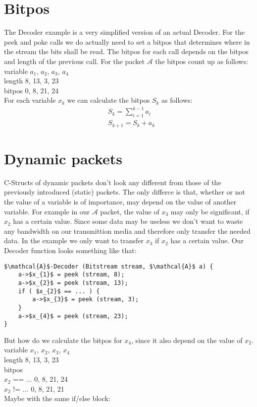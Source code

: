 \documentclass[paper=a4,DIV=12]{scrartcl}
\begin{document}
	\section{Bitpos}
		The Decoder example is a very simplified version of an actual Decoder. For the peek and poke calls we do actually need to set a bitpos
		that determines where in the stream the bits shall be read. The bitpos for each call depends on the bitpos and length of the previous call.
		For the packet $\mathcal{A}$ the bitpos count up as follows:\\
		variable   $a_{1}$, $a_{2}$, $a_{3}$, $a_{4}$\\
		length      8, 13,  3, 23\\
		bitpos      0,  8, 21, 24\\
		For each variable $x_{k}$ we can calculate the bitpos $S_{k}$ as follows:
		\begin{align*}
			&S_{k} = \sum_{i=1}^{k-1} a_{i}\\
			&S_{k+1} = S_{k} + a_{k}
		\end{align*}
	\section{Dynamic packets}
		C-Structs of dynamic packets don't look any different from those of the previously introduced (static) packets.
		The only differce is that, whether or not the value of a variable is of importance, may depend on the value of another variable.	
		For example in our $\mathcal{A}$ packet, the value of $x_{3}$ may only be significant, if $x_{2}$ has a certain value.
		Since some data may be useless we don't want to waste any bandwidth on our transmittion media and therefore only transfer the needed data.
		In the example we only want to transfer $x_{3}$ if $x_{2}$ has a certain value.
		Our Decoder function looks something like that:

		\begin{lstlisting}[mathescape]
$\mathcal{A}$-Decoder (Bitstream stream, $\mathcal{A}$ a) {
	a->$x_{1}$ = peek (stream, 8);
	a->$x_{2}$ = peek (stream, 13);
	if ( $x_{2}$ == ... ) {
		a->$x_{3}$ = peek (stream, 3);
	}
	a->$x_{4}$ = peek (stream, 23);
}
		\end{lstlisting}

		But how do we calculate the bitpos for $x_{4}$, since it also depend on the value of $x_{2}$.\\
		variable   $x_{1}$, $x_{2}$, $x_{3}$, $x_{4}$\\
		length        8, 13, 3, 23\\
		bitpos\\
		$x_{2}$ == ...  0, 8, 21, 24\\
		$x_{2}$ != ...  0, 8, 21, 21\\
		Maybe with the same if/else block:
\end{document}
